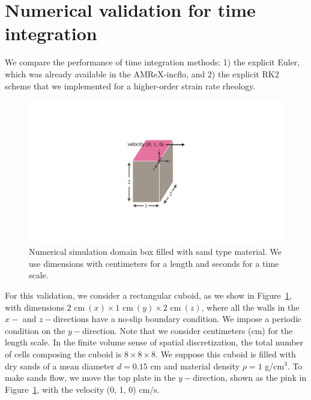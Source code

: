 \section{Numerical validation for time integration}
We compare the performance of time integration methods: 1) the explicit Euler, which was already available in the AMReX-incflo, and 2) the explicit RK2 scheme that we implemented for a higher-order strain rate rheology.
\begin{figure}[ht]
  \begin{center}
    \includegraphics[scale=0.3]{figures/fig_granular_domain.pdf}
    \end{center}
  \caption{Numerical simulation domain box filled with sand type material. We use dimensions with centimeters for a length and seconds for a time scale.}
  \label{fig_granular_domain}
\end{figure}
\par
For this validation, we consider a rectangular cuboid, as we show in Figure~\ref{fig_granular_domain}, with dimensions $2 \text{ cm} \ (x) \times 1 \text{ cm} \  (y) \times 2 \text{ cm} \ (z)$, where all the walls in the $x-$ and $z-$directions have a no-slip boundary condition. We impose a periodic condition on the $y-$direction. Note that we consider centimeters (cm) for the length scale. 
In the finite volume sense of spatial discretization, the total number of cells composing the cuboid is $8 \times 8 \times 8$.
We suppose this cuboid is filled with dry sands of a mean diameter $d = 0.15$ cm and material density $\rho = 1$ g/cm$^3$. To make sands flow, we move the top plate in the $y-$direction, shown as the pink in Figure~\ref{fig_granular_domain}, with the velocity (0, 1, 0) cm/s.

